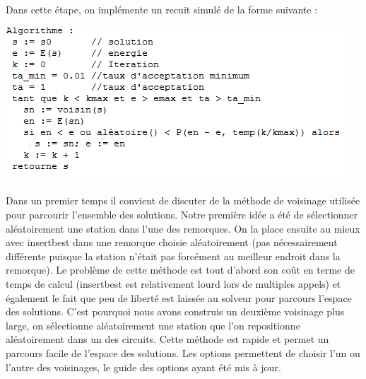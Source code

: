 \documentclass[a4paper, 11pt]{article} %
\begin{document}
\paragraph*{}
Dans cette étape, on implémente un recuit simulé de la forme suivante :

\begin{center}
\includegraphics{recuit.png}
\end{center}


\paragraph*{}
Dans un premier temps il convient de discuter de la méthode de voisinage utilisée pour parcourir l'ensemble des solutions. Notre première idée a été de sélectionner aléatoirement une station dans l'une des remorques. On la place ensuite au mieux avec insertbest dans une remorque choisie aléatoirement (pas nécessairement différente puisque la station n'était pas forcément au meilleur endroit dans la remorque). Le problème de cette méthode est tout d'abord son coût en terme de temps de calcul (insertbest est relativement lourd lors de multiples appels) et également le fait que peu de liberté est laissée au solveur pour parcours l'espace des solutions. C'est pourquoi nous avons construis un deuxième voisinage plus large, on sélectionne aléatoirement une station que l'on repositionne aléatoirement dans un des circuits. Cette méthode est rapide et permet un parcours facile de l'espace des solutions. Les options permettent de choisir l'un ou l'autre des voisinages, le guide des options ayant été mis à jour.
\end{document}
